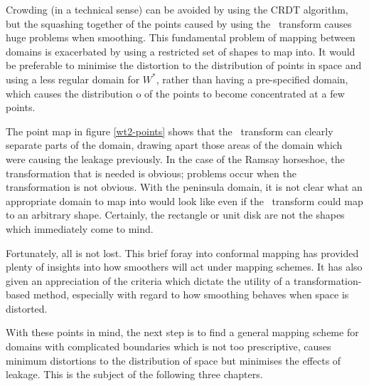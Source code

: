 Crowding (in a technical sense) can be avoided by using the CRDT algorithm, but the squashing together of the points caused by using the \sch\ transform causes huge problems when smoothing. This fundamental problem of mapping between domains is exacerbated by using a restricted set of shapes to map into. It would be preferable to minimise the distortion to the distribution of points in space and using a less regular domain for $W^*$, rather than having a pre-specified domain, which causes the distribution o of the points to become concentrated at a few points.

The point map in figure \ref{wt2-points} shows that the \sch\ transform can clearly separate parts of the domain, drawing apart those areas of the domain which were causing the leakage previously. In the case of the Ramsay horseshoe, the transformation that is needed is obvious; problems occur when the transformation is not obvious. With the peninsula domain, it is not clear what an appropriate domain to map into would look like even if the \sch\ transform could map to an arbitrary shape. Certainly, the rectangle or unit disk are not the shapes which immediately come to mind.

Fortunately, all is not lost. This brief foray into conformal mapping has provided plenty of insights into how smoothers will act under mapping schemes. It has also given an appreciation of the criteria which dictate the utility of a transformation-based method, especially with regard to how smoothing behaves when space is distorted.

With these points in mind, the next step is to find a general mapping scheme for domains with complicated boundaries which is not too prescriptive, causes minimum distortions to the distribution of space but minimises the effects of leakage. This is the subject of the following three chapters.



